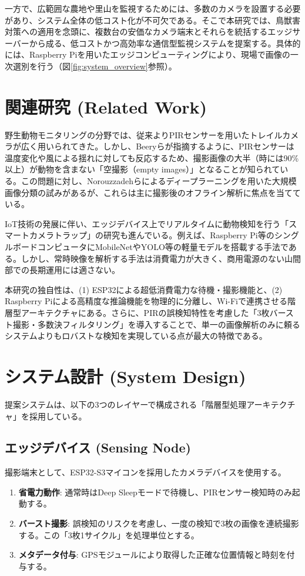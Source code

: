 \documentclass[twocolumn,a4paper]{article}
\begin{document}
一方で、広範囲な農地や里山を監視するためには、多数のカメラを設置する必要があり、システム全体の低コスト化が不可欠である。そこで本研究では、鳥獣害対策への適用を念頭に、複数台の安価なカメラ端末とそれらを統括するエッジサーバーから成る、低コストかつ高効率な通信型監視システムを提案する。具体的には、Raspberry Piを用いたエッジコンピューティングにより、現場で画像の一次選別を行う（図\ref{fig:system_overview}参照）。

\section{関連研究 (Related Work)}
野生動物モニタリングの分野では、従来よりPIRセンサーを用いたトレイルカメラが広く用いられてきた。しかし、Beeryら\cite{beery2019iwildcam}が指摘するように、PIRセンサーは温度変化や風による揺れに対しても反応するため、撮影画像の大半（時には90\%以上）が動物を含まない「空撮影（empty images）」となることが知られている。この問題に対し、Norouzzadehらによるディープラーニングを用いた大規模画像分類の試みがあるが、これらは主に撮影後のオフライン解析に焦点を当てている。

IoT技術の発展に伴い、エッジデバイス上でリアルタイムに動物検知を行う「スマートカメラトラップ」の研究も進んでいる。例えば、Raspberry Pi等のシングルボードコンピュータにMobileNetやYOLO等の軽量モデルを搭載する手法である\cite{redmon2016yolo}。しかし、常時映像を解析する手法は消費電力が大きく、商用電源のない山間部での長期運用には適さない。

本研究の独自性は、(1) ESP32による超低消費電力な待機・撮影機能と、(2) Raspberry Piによる高精度な推論機能を物理的に分離し、Wi-Fiで連携させる階層型アーキテクチャにある。さらに、PIRの誤検知特性を考慮した「3枚バースト撮影・多数決フィルタリング」を導入することで、単一の画像解析のみに頼るシステムよりもロバストな検知を実現している点が最大の特徴である。

\section{システム設計 (System Design)}
提案システムは、以下の3つのレイヤーで構成される「階層型処理アーキテクチャ」を採用している。

\subsection{エッジデバイス (Sensing Node)}
撮影端末として、ESP32-S3マイコンを採用したカメラデバイスを使用する。
\begin{enumerate}
    \item \textbf{省電力動作}: 通常時はDeep Sleepモードで待機し、PIRセンサー検知時のみ起動する。
    \item \textbf{バースト撮影}: 誤検知のリスクを考慮し、一度の検知で3枚の画像を連続撮影する。この「3枚1サイクル」を処理単位とする。
    \item \textbf{メタデータ付与}: GPSモジュールにより取得した正確な位置情報と時刻を付与する。
\end{enumerate}
\end{document}
